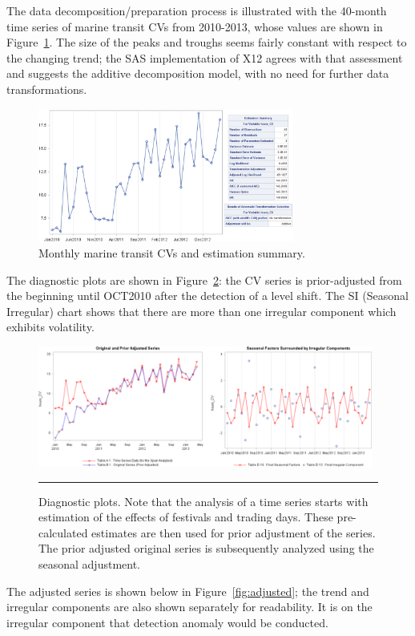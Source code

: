 \begin{Example}
The data decomposition/preparation process is illustrated with the 40-month time series of marine transit CVs from 2010-2013, whose values are shown in Figure~\ref{fig:cv_cont}.  The size of the peaks and troughs seems fairly constant with respect to the changing trend; the SAS implementation of X12 agrees with that assessment and suggests the additive decomposition model, with  no need for further data transformations.
\begin{figure}[t]
\centering
\includegraphics[width=0.75\textwidth]{Images/CV_continuously.png}
\caption{\small Monthly marine transit CVs and estimation summary.}
\label{fig:cv_cont}
\end{figure}
\par The diagnostic plots are shown in Figure~\ref{fig:diff}: the CV series is prior-adjusted from the beginning until OCT2010 after the detection of a level shift. The SI (Seasonal Irregular) chart shows that there are more than one irregular component which exhibits volatility.
\begin{figure}[t]
\centering
\includegraphics[width=0.98\textwidth]{Images/DiffComponents.png}
\caption[Diagnostic plots.]{\small Diagnostic plots. Note that the analysis of a time series starts with estimation of the effects of festivals and trading days. These pre-calculated
estimates are then used for prior adjustment of the series. The prior adjusted original series is subsequently analyzed using the seasonal adjustment.}\hrule
\label{fig:diff}
\end{figure}
The adjusted series is shown below in Figure~\ref{fig:adjusted}; the trend and irregular components are also shown separately for readability. It is on the irregular component that detection anomaly would be conducted. 

\end{Example}
